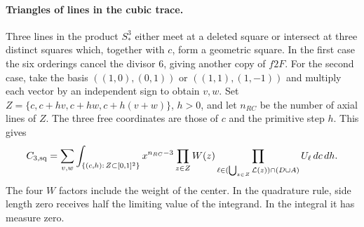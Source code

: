 \paragraph{Triangles of lines in the cubic trace.} Three lines in the product \(S_*^3\) either meet at a
deleted square or intersect at three distinct squares which, together with \(c\), form a geometric
square. In the first case the six orderings cancel the divisor \(6\), giving another copy of \(f2F\). For
the second case, take the basis \(((1,0),(0,1))\) or \(((1,1),(1,-1))\) and multiply each vector by an
independent sign to obtain \(v,w\). Set \(Z=\{c,c+hv,c+hw,c+h(v+w)\}\), \(h>0\), and let \(n_{RC}\) be
the number of axial lines of \(Z\). The three free coordinates are those of \(c\) and the primitive step
\(h\). This gives \[
 C_{3,\rm sq}=\sum_{v,w}\int_{\{(c,h):\,Z\subset[0,1]^2\}}
  x^{n_{RC}-3}\prod_{z\in Z}W(z)
  \prod_{\ell\in(\bigcup_{z\in Z}\mathcal L(z))\cap(D\cup A)}U_\ell\,dc\,dh .
\] The four \(W\) factors include the weight of the center. In the quadrature rule, side length zero
receives half the limiting value of the integrand. In the integral it has measure zero.

  
